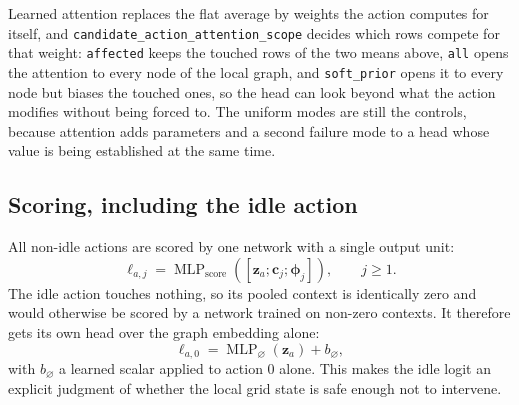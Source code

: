 \noindent Learned attention replaces the flat average by weights the action computes for
itself, and \texttt{candidate\_action\_attention\_scope} decides which rows
compete for that weight: \texttt{affected} keeps the touched rows of the two
means above, \texttt{all} opens the attention to every node of the local graph,
and \texttt{soft\_prior} opens it to every node but biases the touched ones,
so the head can look beyond what the action modifies without being forced to.
The uniform modes are still the controls, because attention adds parameters and
a second failure mode to a head whose value is being established at the same
time.

\subsection{Scoring, including the idle action}
\label{subsec:candidate-scorer}

All non-idle actions are scored by one network with a single output unit:
\begin{equation}
  \ell_{a,j} =
  \operatorname{MLP}_{\mathrm{score}}
  \left(
    \left[\mathbf{z}_a;\mathbf{c}_j;\boldsymbol{\phi}_j\right]
  \right),
  \qquad j\geq 1.
  \label{eq:candidate-shared-scorer}
\end{equation}
The idle action touches nothing, so its pooled context is identically zero and
would otherwise be scored by a network trained on non-zero contexts. It
therefore gets its own head over the graph embedding alone:
\begin{equation}
  \ell_{a,0} =
  \operatorname{MLP}_{\varnothing}(\mathbf{z}_a) + b_{\varnothing},
  \label{eq:candidate-do-nothing-head}
\end{equation}
with $b_{\varnothing}$ a learned scalar applied to action $0$ alone. This makes
the idle logit an explicit judgment of whether the local grid state is safe
enough not to intervene.

